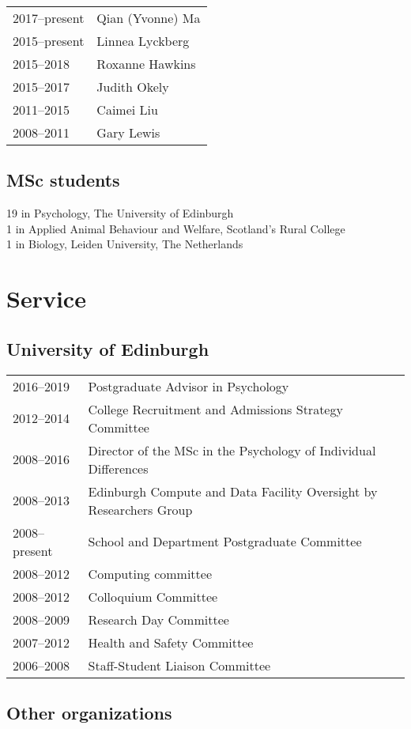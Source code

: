 \documentclass[11pt]{article}
\begin{document}
\begin{tabular}{p{3cm}p{12cm}}
2017--present & Qian (Yvonne) Ma \\
2015--present & Linnea Lyckberg \\
2015--2018 & Roxanne Hawkins \\
2015--2017 & Judith Okely \\
2011--2015 & Caimei Liu \\
2008--2011 & Gary Lewis
\end{tabular}

\subsection*{MSc students}
19 in Psychology, The University of Edinburgh \\
1 in Applied Animal Behaviour and Welfare, Scotland's Rural College \\
1 in Biology, Leiden University, The Netherlands

\section*{Service}
\subsection*{University of Edinburgh}

\begin{tabular}{p{3cm}p{12cm}}
2016--2019 & Postgraduate Advisor in Psychology \\
2012--2014 & College Recruitment and Admissions Strategy Committee \\
2008--2016 & Director of the MSc in the Psychology of Individual
Differences \\
2008--2013 & Edinburgh Compute and Data Facility Oversight by
Researchers Group \\
2008--present & School and Department Postgraduate Committee \\
2008--2012 & Computing committee \\
2008--2012 & Colloquium Committee \\
2008--2009 & Research Day Committee \\
2007--2012 & Health and Safety Committee \\
2006--2008 & Staff-Student Liaison Committee
\end{tabular}

\subsection*{Other organizations}
\end{document}
